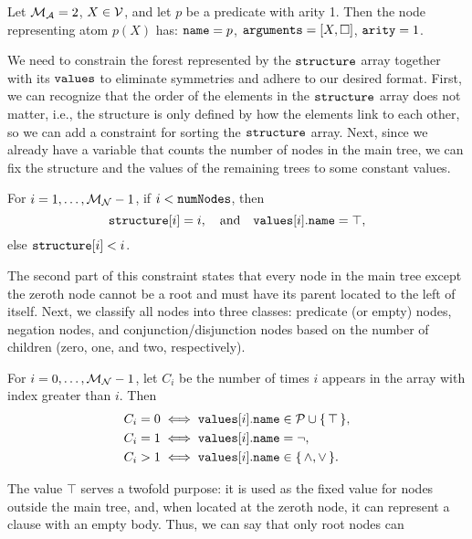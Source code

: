 \begin{example}
  Let $\mathcal{M}_{\mathcal{A}}{} = 2$, $X \in \mathcal{V}{}$, and let $p$ be a predicate with
  arity 1. Then the node representing atom $p(X)$ has: $\texttt{\textup{name}} = p$,
  $\texttt{\textup{arguments}} = [X, \Box]$, $\texttt{\textup{arity}} = 1$.
\end{example}

We need to constrain the forest represented by the $\texttt{\textup{structure}}$ array
together with its $\texttt{\textup{values}}$ to eliminate symmetries and adhere to our
desired format. First, we can recognize that the order of the elements in the
$\texttt{\textup{structure}}$ array does not matter, i.e., the structure is only
defined by how the elements link to each other, so we can add a constraint for
sorting the $\texttt{\textup{structure}}$ array. Next, since we already have a variable
that counts the number of nodes in the main tree, we can fix the structure and
the values of the remaining trees to some constant values.
\begin{constraint}
  For $i = 1, \dots, \mathcal{M}_{\mathcal{N}}{} - 1$, if $i < \texttt{\textup{numNodes}}$, then
  \[
    \texttt{\textup{structure}}[i] = i, \quad \text{and} \quad
    \texttt{\textup{values}}[i].\texttt{\textup{name}} = \top,
  \]
  else $\texttt{\textup{structure}}[i] < i$.
\end{constraint}
The second part of this constraint states that every node in the main tree
except the zeroth node cannot be a root and must have its parent located to
the left of itself. Next, we classify all nodes into three classes: predicate
(or empty) nodes, negation nodes, and conjunction/disjunction nodes based on the
number of children (zero, one, and two, respectively).
\begin{constraint}\label{constraint:node_types}
  For $i = 0, \dots, \mathcal{M}_{\mathcal{N}}{} - 1$, let $C_i$ be the number of times $i$
  appears in the  array with index greater than $i$. Then
  \begin{align*}
    C_i = 0 &\iff \texttt{\textup{values}}[i].\texttt{\textup{name}} \in \mathcal{P}{} \cup \{\, \top \,\},\\
    C_i = 1 &\iff \texttt{\textup{values}}[i].\texttt{\textup{name}} = \neg,\\
    C_i > 1 &\iff \texttt{\textup{values}}[i].\texttt{\textup{name}} \in \{\, \land, \lor \,\}.
  \end{align*}
\end{constraint}
The value $\top$ serves a twofold purpose: it is used as the fixed value for
nodes outside the main tree, and, when located at the zeroth node, it can
represent a clause with an empty body. Thus, we can say that only root nodes can
